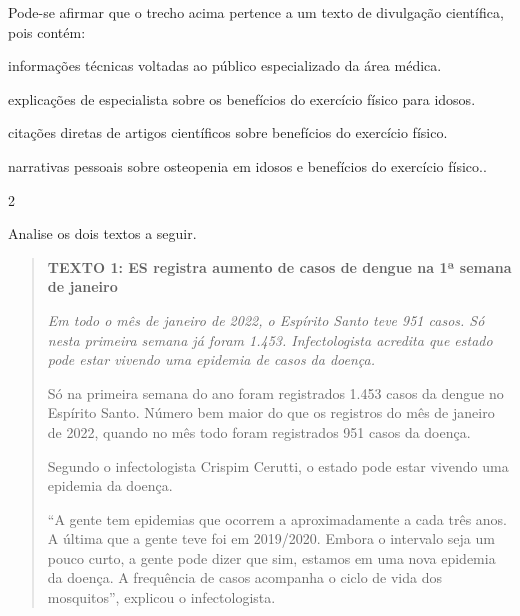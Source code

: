 Pode-se afirmar que o trecho acima pertence a um texto de divulgação científica, pois contém:

\begin{escolha}
  
  \item informações técnicas voltadas ao público especializado da área médica.
  
  \item explicações de especialista sobre os benefícios do exercício físico para idosos.
  
  \item citações diretas de artigos científicos sobre benefícios do exercício físico.
  
  \item narrativas pessoais sobre osteopenia em idosos e benefícios do exercício físico..

\end{escolha}

\num{2}

Analise os dois textos a seguir.

\begin{quote}

\textbf{TEXTO 1: ES registra aumento de casos de dengue na 1ª semana de janeiro}

\textit{Em todo o mês de janeiro de 2022, o Espírito Santo teve 951
casos. Só nesta primeira semana já foram 1.453. Infectologista acredita
que estado pode estar vivendo uma epidemia de casos da doença.}

Só na primeira semana do ano foram registrados 1.453 casos da dengue no
Espírito Santo. Número bem maior do que os registros do mês de janeiro
de 2022, quando no mês todo foram registrados 951 casos da doença.

Segundo o infectologista Crispim Cerutti, o estado pode estar vivendo
uma epidemia da doença.

``A gente tem epidemias que ocorrem a aproximadamente a cada três anos. A
última que a gente teve foi em 2019/2020. Embora o intervalo seja um
pouco curto, a gente pode dizer que sim, estamos em uma nova epidemia da
doença. A frequência de casos acompanha o ciclo de vida dos mosquitos'',
explicou o infectologista.

\end{quote}


